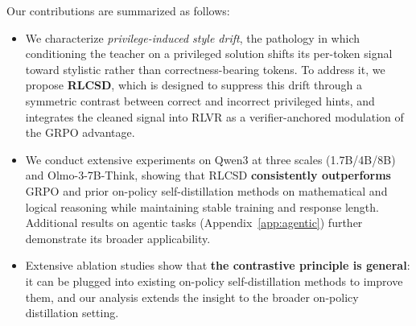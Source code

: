 Our contributions are summarized as follows:

\begin{itemize}
\item We characterize \emph{privilege-induced style drift}, the pathology in which conditioning the teacher on a privileged solution shifts its per-token signal toward stylistic rather than correctness-bearing tokens. To address it, we propose \textbf{RLCSD}, which is designed to suppress this drift through a symmetric contrast between correct and incorrect privileged hints, and integrates the cleaned signal into RLVR as a verifier-anchored modulation of the GRPO advantage.
\item We conduct extensive experiments on Qwen3 at three scales (1.7B/4B/8B) and Olmo-3-7B-Think, showing that RLCSD \textbf{consistently outperforms} GRPO and prior on-policy self-distillation methods on mathematical and logical reasoning while maintaining stable training and response length. Additional results on agentic tasks (Appendix~\ref{app:agentic}) further demonstrate its broader applicability.
\item Extensive ablation studies show that \textbf{the contrastive principle is general}: it can be plugged into existing on-policy self-distillation methods to improve them, and our analysis extends the insight to the broader on-policy distillation setting.
\end{itemize}






